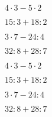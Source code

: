 \begin{alist}
\item $ 4\cdot 3-5\cdot 2 $
\item $ 15:3+18:2 $
\item $ 3\cdot 7-24:4 $
\item $ 32:8+28:7 $
\end{alist}
\begin{alist}
\item $ 4\cdot 3-5\cdot 2 $
\item $ 15:3+18:2 $
\item $ 3\cdot 7-24:4 $
\item $ 32:8+28:7 $
\end{alist}
